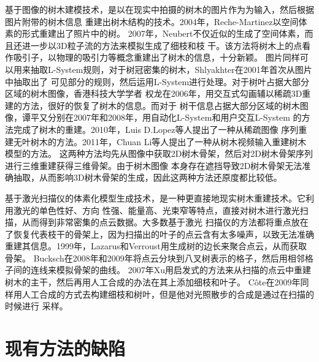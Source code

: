 基于图像的树木建模技术，是以在现实中拍摄的树木的图片作为为输入，然后根据图片附带的树木信息
重建出树木结构的技术。2004年，Reche-Martinez以空间体素的形式重建出了照片中的树\cite{reche}。
2007年，Neubert不仅近似的生成了空间体素，而且还进一步以3D粒子流的方法来模拟生成了细枝和枝
干\cite{neubert}。该方法将树木上的点看作吸引子，以物理的吸引力等概念重建出了树木的信息，十分新颖。
图片同样可以用来抽取L-System规则，对于树冠密集的树木，Shlyakhter在2001年首次从图片中抽取出了
可见部分的规则，然后运用L-System进行处理。对于树叶占据大部分区域的树木图像，香港科技大学学者
权龙在2006年，用交互式勾画辅以稀疏3D重建的方法，很好的恢复了树木的信息\cite{quanlong}。而对于
树干信息占据大部分区域的树木图像，谭平又分别在2007年和2008年，用自动化L-System和用户交互L-System
的方法完成了树木的重建\cite{tanping,tanping2}。2010年，Luis D.Lopez等人提出了一种从稀疏图像
序列重建无叶树木的方法。2011年，Chuan Li等人提出了一种从树木视频输入重建树木模型的方法\cite{lichuan}。
这两种方法均先从图像中获取2D树木骨架，然后对2D树木骨架序列进行三维重建获得三维骨架。由于树木图像
本身存在遮挡导致2D树木骨架无法准确抽取，从而影响3D树木骨架的生成，因此这两种方法还原度都比较低。

基于激光扫描仪的体素化模型生成技术，是一种更直接地现实树木重建技术。它利用激光的单色性好、方向
性强、能量高、光束窄等特点，直接对树木进行激光扫描，从而得到非常密集的点云数据。大多数基于激光
扫描仪的方法都将重点放在了恢复代表枝干的骨架上，因为扫描出的叶子的点云含有太多噪声，以致无法准确
重建其信息。1999年，Lazarus和Verroust用生成树的边长来聚合点云，从而获取骨架\cite{verroust}。
Bucksch在2008年和2009年将点云分块到八叉树表示的格子，然后用相邻格子间的连线来模拟骨架的曲线\cite{bucksch}。
2007年Xu用启发式的方法来从扫描的点云中重建树木的主干，然后再用人工合成的办法在其上添加细枝和叶子\cite{xu}。
C\^ote在2009年同样用人工合成的方式去构建细枝和树叶，但是他对光照散步的合成是通过在扫描的时候进行
采样\cite{cote}。

\section{现有方法的缺陷}

